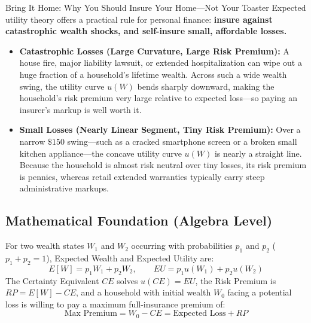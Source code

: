 \documentclass[11pt,letterpaper]{article}
\begin{document}
\begin{examplecase}{Bring It Home: Why You Should Insure Your Home—Not Your Toaster}
Expected utility theory offers a practical rule for personal finance: \textbf{insure against catastrophic wealth shocks, and self-insure small, affordable losses.}
\begin{itemize}
    \item \textbf{Catastrophic Losses (Large Curvature, Large Risk Premium):} A house fire, major liability lawsuit, or extended hospitalization can wipe out a huge fraction of a household's lifetime wealth. Across such a wide wealth swing, the utility curve $u(W)$ bends sharply downward, making the household's risk premium very large relative to expected loss—so paying an insurer's markup is well worth it.
    \item \textbf{Small Losses (Nearly Linear Segment, Tiny Risk Premium):} Over a narrow $\$150$ swing—such as a cracked smartphone screen or a broken small kitchen appliance—the concave utility curve $u(W)$ is nearly a straight line. Because the household is almost risk neutral over tiny losses, its risk premium is pennies, whereas retail extended warranties typically carry steep administrative markups.
\end{itemize}
\end{examplecase}

\subsection*{Mathematical Foundation (Algebra Level)}
For two wealth states $W_1$ and $W_2$ occurring with probabilities $p_1$ and $p_2$ ($p_1 + p_2 = 1$), Expected Wealth and Expected Utility are:
\begin{equation}
E[W] = p_1 W_1 + p_2 W_2, \qquad EU = p_1 u(W_1) + p_2 u(W_2)
\end{equation}
The Certainty Equivalent $CE$ solves $u(CE) = EU$, the Risk Premium is $RP = E[W] - CE$, and a household with initial wealth $W_0$ facing a potential loss is willing to pay a maximum full-insurance premium of:
\begin{equation}
\text{Max Premium} = W_0 - CE = \text{Expected Loss} + RP
\end{equation}
\end{document}
